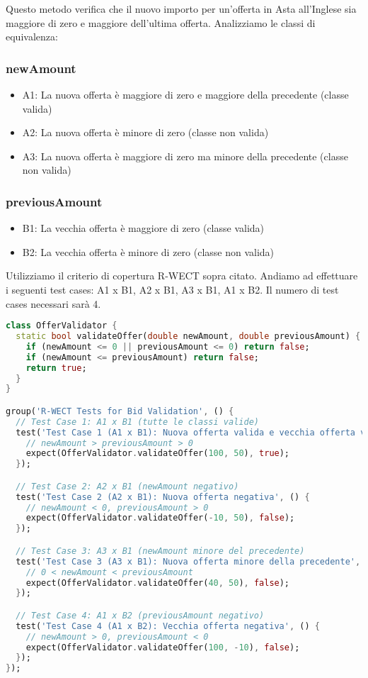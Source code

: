 Questo metodo verifica che il nuovo importo per un'offerta in Asta all'Inglese sia maggiore di zero e maggiore dell'ultima offerta.\meskip
Analizziamo le classi di equivalenza:

\subsubsection*{newAmount}

\begin{itemize}
	\item A1: La nuova offerta è maggiore di zero e maggiore della precedente (classe valida)
	\item A2: La nuova offerta è minore di zero (classe non valida)
	\item A3: La nuova offerta è maggiore di zero ma minore della precedente (classe non valida)
\end{itemize}

\subsubsection*{previousAmount}

\begin{itemize}
	\item B1: La vecchia offerta è maggiore di zero (classe valida)
	\item B2: La vecchia offerta è minore di zero (classe non valida)
\end{itemize}\medskip

\noindent
Utilizziamo il criterio di copertura R-WECT sopra citato. Andiamo ad effettuare i seguenti test cases: A1 x B1, A2 x B1, A3 x B1, A1 x B2. Il numero di test cases necessari sarà 4.

\begin{lstlisting}[language=Dart]
class OfferValidator {
  static bool validateOffer(double newAmount, double previousAmount) {
    if (newAmount <= 0 || previousAmount <= 0) return false;
    if (newAmount <= previousAmount) return false;
    return true;
  }
}

group('R-WECT Tests for Bid Validation', () {
  // Test Case 1: A1 x B1 (tutte le classi valide)
  test('Test Case 1 (A1 x B1): Nuova offerta valida e vecchia offerta valida', () {
    // newAmount > previousAmount > 0
    expect(OfferValidator.validateOffer(100, 50), true);
  });

  // Test Case 2: A2 x B1 (newAmount negativo)
  test('Test Case 2 (A2 x B1): Nuova offerta negativa', () {
    // newAmount < 0, previousAmount > 0
    expect(OfferValidator.validateOffer(-10, 50), false);
  });

  // Test Case 3: A3 x B1 (newAmount minore del precedente)
  test('Test Case 3 (A3 x B1): Nuova offerta minore della precedente', () {
    // 0 < newAmount < previousAmount
    expect(OfferValidator.validateOffer(40, 50), false);
  });

  // Test Case 4: A1 x B2 (previousAmount negativo)
  test('Test Case 4 (A1 x B2): Vecchia offerta negativa', () {
    // newAmount > 0, previousAmount < 0
    expect(OfferValidator.validateOffer(100, -10), false);
  });
});
    \end{lstlisting}
\newpage

